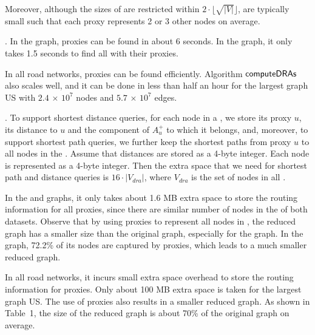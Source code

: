  Moreover, although the sizes of \dras are restricted within $2\cdot\lfloor\sqrt{|V|}\rfloor$, \dras are typically small such that each proxy represents 2 or 3 other nodes on average.







.
In the \dblp graph, proxies can be found in about 6 seconds. In the \dblpone graph, it only takes 1.5 seconds to find all \dras with their proxies.

In all road networks, proxies can be found efficiently. Algorithm ${\mathsf{computeDRAs}}$ also scales well, and it can be done in less than half an hour for the largest graph US with $2.4$ $\times$ $10^7$ nodes and $5.7$ $\times$ $10^7$ edges.

.
To support shortest distance queries, for each node in a \dra, we store its proxy $u$, its distance to $u$ and the component of $A^{+}_u$ to which it belongs, and, moreover, to support shortest path queries, we further keep the shortest paths from proxy $u$ to all nodes in the \dra. Assume that distances are stored as a 4-byte integer. Each node is represented as a 4-byte integer. Then the extra space that we need for shortest path and distance queries is $16\cdot |V_{dra}|$, where $V_{dra}$ is the set of nodes in all \dras.

In the \dblp and \dblpone graphs, it only takes about 1.6 MB extra space to store the routing information for all proxies, since there are similar number of nodes in the \dras of both datasets. Observe that by using proxies to represent all nodes in \dras, the reduced graph  has a smaller size than the original graph, especially for the \dblpone graph. In the \dblpone graph, 72.2\% of its nodes are captured by proxies, which leads to a much smaller reduced graph.

In all road networks, it incurs small extra space overhead to store the routing information for proxies. Only about 100 MB extra space is taken for the largest graph US. The use of proxies also results in a smaller reduced graph. As shown in Table~1, the size of the reduced graph is about 70\% of the original graph on average.



